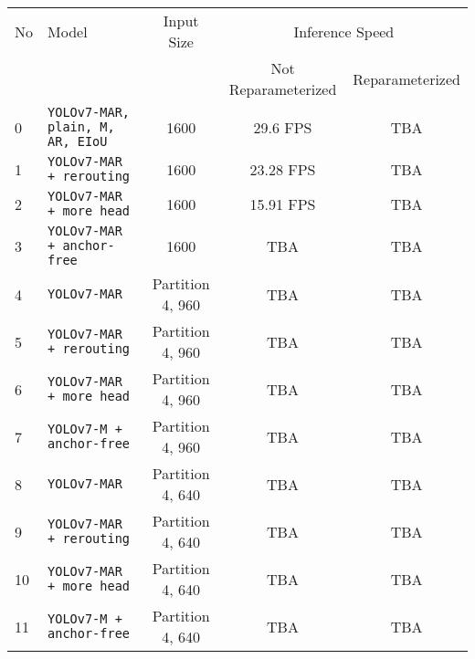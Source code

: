 \begin{tabular}{ l l c c c}
  \toprule[1.5pt]
  No & Model                                       &   Input Size         &\multicolumn{2}{c}{Inference Speed}                   \\
     &                                             &                      &Not Reparameterized  &  Reparameterized   \\
  \midrule
  0  & \texttt{YOLOv7-MAR, plain, M, AR, EIoU}     &      1600            & 29.6 FPS            & TBA   \\
  1  & \texttt{YOLOv7-MAR + rerouting}             &      1600            & 23.28 FPS           & TBA   \\
  2  & \texttt{YOLOv7-MAR + more head}                 &      1600            & 15.91 FPS           & TBA   \\
  3  & \texttt{YOLOv7-MAR + anchor-free}               &      1600            & TBA                 & TBA   \\
  \midrule
  4  & \texttt{YOLOv7-MAR}                         &  Partition 4, 960    & TBA                 & TBA   \\
  5  & \texttt{YOLOv7-MAR + rerouting}             &  Partition 4, 960    & TBA                 & TBA   \\
  6  & \texttt{YOLOv7-MAR + more head}             &  Partition 4, 960    & TBA                 & TBA   \\
  7  & \texttt{YOLOv7-M + anchor-free}           &  Partition 4, 960    & TBA                 & TBA   \\
  \midrule
  8  & \texttt{YOLOv7-MAR}                         &  Partition 4, 640    & TBA                 & TBA   \\
  9  & \texttt{YOLOv7-MAR + rerouting}             &  Partition 4, 640    & TBA                 & TBA   \\
  10 & \texttt{YOLOv7-MAR + more head}             &  Partition 4, 640    & TBA                 & TBA   \\
  11 & \texttt{YOLOv7-M + anchor-free}           &  Partition 4, 640    & TBA                 & TBA   \\
  \bottomrule[1.5pt]
\end{tabular}